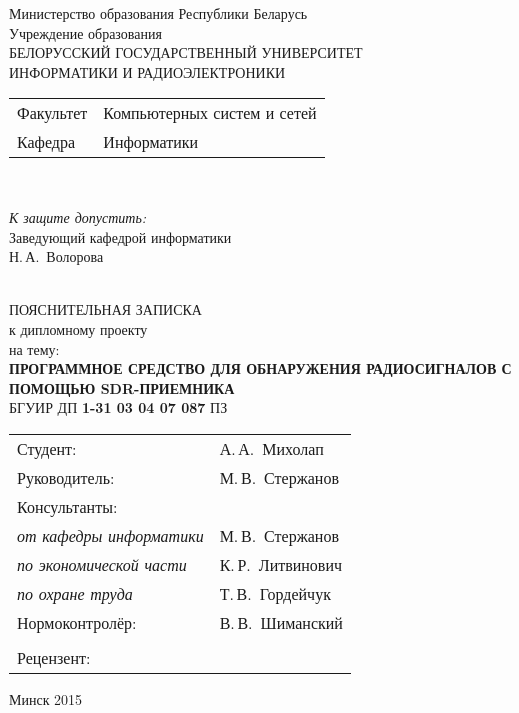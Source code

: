 \begin{titlepage}
  \begin{center}
    Министерство образования Республики Беларусь\\[1em]
    Учреждение образования\\
    БЕЛОРУССКИЙ ГОСУДАРСТВЕННЫЙ УНИВЕРСИТЕТ \\
    ИНФОРМАТИКИ И РАДИОЭЛЕКТРОНИКИ\\[1em]

    \begin{minipage}{\textwidth}
      \begin{flushleft}
        \begin{tabular}{ l l }
          Факультет & Компьютерных систем и сетей\\
          Кафедра   & Информатики
        \end{tabular}
      \end{flushleft}
    \end{minipage}\\[1em]

    \begin{minipage}{\textwidth}
      \begin{flushright}
        \textit{К защите допустить:}\\
        Заведующий кафедрой информатики\\
        \underline{\hspace*{4.5cm}} Н.\,А.~Волорова
      \end{flushright}
    \end{minipage}\\[3em]

    {ПОЯСНИТЕЛЬНАЯ ЗАПИСКА}\\
    {к дипломному проекту}\\
    {на тему:}\\[1em]
    \textbf{\large ПРОГРАММНОЕ СРЕДСТВО ДЛЯ ОБНАРУЖЕНИЯ РАДИОСИГНАЛОВ С ПОМОЩЬЮ SDR-ПРИЕМНИКА}\\[1em]


    {БГУИР ДП \textbf{1-31 03 04 07 087} ПЗ}\\[2em]
    
    \begin{tabular}{ p{}p{} }
      Студент: & А.\,А.~Михолап \\
      Руководитель: & М.\,В.~Стержанов \\
      Консультанты: &\\
      \hspace*{3ex}\emph{от кафедры информатики} & М.\,В.~Стержанов \\
      \hspace*{3ex}\emph{по экономической части} & К.\,Р.~Литвинович \\
      \hspace*{3ex}\emph{по охране труда} & Т.\,В.~Гордейчук \\
      Нормоконтролёр: & В.\,В.~Шиманский\\
      \\
      Рецензент: &
    \end{tabular}
    
    \vfill
    {\normalsize Минск 2015}
  \end{center}
\end{titlepage}
